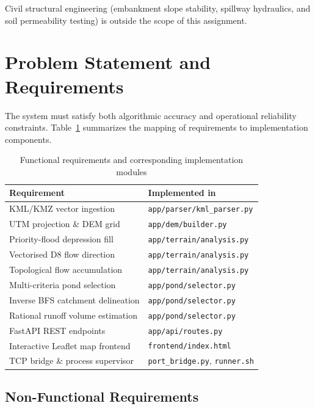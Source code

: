 \documentclass[manuscript,screen,review]{acmart}
\begin{document}
Civil structural engineering (embankment slope stability, spillway hydraulics, and soil permeability testing)
is outside the scope of this assignment.

\section{Problem Statement and Requirements}
\label{sec:requirements}

The system must satisfy both algorithmic accuracy and operational reliability constraints.
Table~\ref{tab:requirements} summarizes the mapping of requirements to implementation components.

\begin{table}[h]
  \caption{Functional requirements and corresponding implementation modules}
  \label{tab:requirements}
  \begin{tabular}{p{3.8cm}p{4.2cm}}
    \toprule
    Requirement & Implemented in \\
    \midrule
    KML/KMZ vector ingestion & \texttt{app/parser/kml\_parser.py} \\
    UTM projection \& DEM grid & \texttt{app/dem/builder.py} \\
    Priority-flood depression fill & \texttt{app/terrain/analysis.py} \\
    Vectorised D8 flow direction & \texttt{app/terrain/analysis.py} \\
    Topological flow accumulation & \texttt{app/terrain/analysis.py} \\
    Multi-criteria pond selection & \texttt{app/pond/selector.py} \\
    Inverse BFS catchment delineation & \texttt{app/pond/selector.py} \\
    Rational runoff volume estimation & \texttt{app/pond/selector.py} \\
    FastAPI REST endpoints & \texttt{app/api/routes.py} \\
    Interactive Leaflet map frontend & \texttt{frontend/index.html} \\
    TCP bridge \& process supervisor & \texttt{port\_bridge.py}, \texttt{runner.sh} \\
    \bottomrule
  \end{tabular}
\end{table}

\subsection{Non-Functional Requirements}
\end{document}
